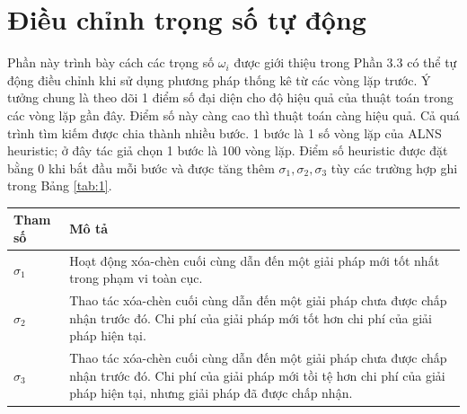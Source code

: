 \section{Điều chỉnh trọng số tự động}
Phần này trình bày cách các trọng số $\omega_i$ được giới thiệu trong Phần 3.3 có thể tự động điều chỉnh khi sử dụng phương pháp thống kê từ các vòng lặp trước. Ý tưởng chung là theo dõi 1 điểm số đại diện cho độ hiệu quả của thuật toán trong các vòng lặp gần đây. Điểm số này càng cao thì thuật toán càng hiệu quả. Cả quá trình tìm kiếm được chia thành nhiều bước. 1 bước là 1 số vòng lặp của ALNS heuristic; ở đây tác giả chọn 1 bước là 100 vòng lặp. Điểm số heuristic được đặt bằng 0 khi bắt đầu mỗi bước và được tăng thêm $\sigma_1, \sigma_2, \sigma_3$ tùy các trường hợp ghi trong Bảng \ref{tab:1}.

\begin{table}[caption={Kết quả tốt nhất, 200 địa điểm}, label=tab:1]
            \begin{tabular}{lp{10cm}}
            \hline
            Tham số     &   Mô tả \\
            \hline
            $\sigma_1$  &   Hoạt động xóa-chèn cuối cùng dẫn đến một giải pháp mới tốt nhất trong phạm vi toàn cục. \\
            $\sigma_2$  &   Thao tác xóa-chèn cuối cùng dẫn đến một giải pháp chưa được chấp nhận trước đó. Chi phí của giải pháp mới tốt hơn chi phí của giải pháp hiện tại. \\
            $\sigma_3$  &   Thao tác xóa-chèn cuối cùng dẫn đến một giải pháp chưa được chấp nhận trước đó. Chi phí của giải pháp mới tồi tệ hơn chi phí của giải pháp hiện tại, nhưng giải pháp đã được chấp nhận. \\
            \hline
        \end{tabular} \\
\end{table}


